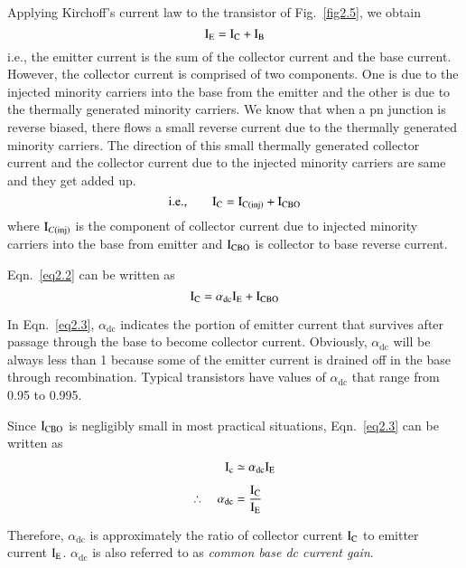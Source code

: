Applying Kirchoff's current law to the transistor of Fig.~\ref{fig2.5}, we obtain
\begin{equation}
\textrm{I}_{\textrm{E}}=\textrm{I}_{\textrm{C}}+\textrm{I}_{\textrm{B}}\label{eq2.1}
\end{equation}
i.e., the emitter current is the sum of the collector current and the base current. However, the collector current is comprised of two components. One is due to the injected minority carriers into the base from the emitter and the other is due to the thermally generated minority carriers. We know that when a pn junction is reverse biased, there flows a small reverse current due to the thermally generated minority carriers. The direction of this small thermally generated collector current and the collector current due to the injected minority carriers are same and they get added up.
\begin{equation}
\text{i.e.,}\qquad \textrm{I}_{\textrm{C}}=\textrm{I}_{\textrm{C}(\text{inj})}+\textrm{I}_{\text{CBO}}\label{eq2.2}
\end{equation}
where $\textrm{I}_{C(\text{inj})}$ is the component of collector current due to injected minority carriers into the base from emitter and $\textrm{I}_{\text{CBO}}$ is collector to base reverse current.

Eqn.~\eqref{eq2.2} can be written as
\begin{equation}
\textrm{I}_{\textrm{C}}=\alpha_{\text{dc}}\textrm{I}_{\textrm{E}}+\textrm{I}_{\text{CBO}}\label{eq2.3}
\end{equation}

In Eqn.~\eqref{eq2.3}, $\alpha_{\text{dc}}$ indicates the portion of emitter current that survives after passage through the base to become collector current. Obviously, $\alpha_{\text{dc}}$ will be always less than 1 because some of the emitter current is drained off in the base through recombination. Typical transistors have values of $\alpha_{\text{dc}}$ that range from 0.95 to 0.995.

Since $\textrm{I}_{\text{CBO}}$ is negligibly small in most practical situations, Eqn.~\eqref{eq2.3} can be written as
\begin{align}
\textrm{I}_{\textrm{c}} &\simeq \alpha_{\text{dc}}\textrm{I}_{\textrm{E}}\label{eq2.4}\\[4pt]
\therefore\quad \alpha_{\text{dc}} &= \frac{\textrm{I}_{\textrm{C}}}{\textrm{I}_{\textrm{E}}}\label{eq2.5}
\end{align}

Therefore, $\alpha_{\text{dc}}$ is approximately the ratio of collector current $\textrm{I}_{\textrm{C}}$ to emitter current $\textrm{I}_{\textrm{E}}$. $\alpha_{\text{dc}}$ is also referred to as {\em common base dc current gain}.

